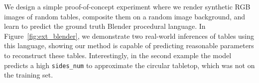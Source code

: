 We design a simple proof-of-concept experiment where we render synthetic RGB images of random tables, composite them on a random image background, and learn to predict the ground truth Blender procedural language.
In Figure~\ref{fig:ext_blender}, we demonstrate two real-world inferences of tables using this language, showing our method is capable of predicting reasonable parameters to reconstruct these tables. Interestingly, in the second example the model predicts a high \texttt{sides\_num} to approximate the circular tabletop, which was not on the training set.
